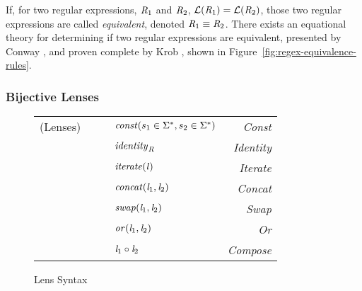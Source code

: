 If, for two regular expressions, $\mathit{R}_1$ and $\mathit{R}_2$,
$\mathcal{L}(\mathit{R}_1)=\mathcal{L}(\mathit{R}_2)$, those two regular expressions
are called \textit{equivalent}, denoted $\mathit{R}_1\equiv\mathit{R}_2$.
There exists an equational theory for determining if two regular expressions are equivalent,
presented by Conway \cite{conway}, and proven complete by Krob \cite{Krob},
shown in Figure~\ref{fig:regex-equivalence-rules}.

\subsubsection{Bijective Lenses}

\begin{figure}
\centering
\begin{tabular}{l@{\ }l@{\ }c@{\ }l@{\ }>{\itshape\/}r}
(Lenses)& \Lens{} & \GEq{} & $\mathit{const}(s_1 \in \Sigma^*,s_2 \in \Sigma^*)$ & Const \\
& & & \GBar{} $\mathit{identity}_{\mathit{R}}$ & Identity\\
& & & \GBar{} $\mathit{iterate(\mathit{l})}$ & Iterate \\
& & & \GBar{} $\mathit{concat}(\mathit{l}_1,\mathit{l}_2)$ & Concat \\
& & & \GBar{} $\mathit{swap}(\mathit{l}_1,\mathit{l}_2)$ & Swap\\
& & & \GBar{} $\mathit{or}(\mathit{l}_1,\mathit{l}_2)$ & Or\\
& & & \GBar{} $\mathit{l}_1 \circ \mathit{l}_2$ & Compose\\
\end{tabular}
\caption{Lens Syntax}
\label{fig:lens-syntax}
\end{figure}

